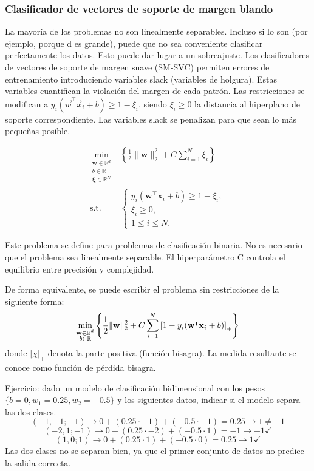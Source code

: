 \subsubsection{Clasificador de vectores de soporte de margen blando}

La mayoría de los problemas no son linealmente separables. Incluso si lo son (por ejemplo, porque d es grande), puede que no sea conveniente clasificar perfectamente los datos. Esto puede dar lugar a un sobreajuste. Los clasificadores de vectores de soporte de margen suave (SM-SVC) permiten errores de entrenamiento introduciendo variables slack (variables de holgura). Estas variables cuantifican la violación del margen de cada patrón. Las restricciones se modifican a $y_i(\vec{w}^\intercal \vec{x}_i + b) \geq 1 - \xi_i$, siendo $\xi_i \geq 0$ la distancia al hiperplano de soporte correspondiente. Las variables slack se penalizan para que sean lo más pequeñas posible.

\begin{align*}
\min_{\substack{\mathbf{w}\in\mathbb{R}^d \\ b\in\mathbb{R} \\ \boldsymbol{\xi}\in\mathbb{R}^N}} &
\left\{\frac{1}{2}\|\mathbf{w}\|_2^2 + C\sum_{i=1}^N \xi_i\right\} \\
\text{s.t.} &
\begin{cases}
y_i(\mathbf{w}^{\intercal}\mathbf{x}_i + b) \geq 1 - \xi_i, \\
\xi_i \geq 0, \\
1 \leq i \leq N.
\end{cases}
\end{align*}

Este problema se define para problemas de clasificación binaria. No es necesario que el problema sea linealmente separable. El hiperparámetro C controla el equilibrio entre precisión y complejidad.

De forma equivalente, se puede escribir el problema sin restricciones de la siguiente forma:
$$
\min_{\begin{subarray}{c}
    \mathbf{w} \in \mathbb{R}^d \\ 
    b \in \mathbb{R}
\end{subarray}} 
\left\{ 
    \frac{1}{2} \|\mathbf{w}\|_2^2 + C \sum_{i=1}^{N} \left[1 - y_i(\mathbf{w}^\intercal \mathbf{x}_i + b)\right]_+ 
\right\}$$
donde $|\chi|_+$ denota la parte positiva (función bisagra). La medida resultante se conoce como función de pérdida bisagra.

Ejercicio: dado un modelo de clasificación bidimensional con los pesos $\{b = 0, w_1 = 0.25, w_2 = -0.5\}$ y los siguientes datos, indicar si el modelo separa las dos clases.
$$(-1, -1; -1) \rightarrow 0 + (0.25 \cdot -1) + (-0.5 \cdot -1) = 0.25 \rightarrow 1 \neq -1$$
$$(-2, 1; -1) \rightarrow 0 + (0.25 \cdot -2) + (-0.5 \cdot 1) = -1 \rightarrow -1 \checkmark$$
$$(1, 0; 1) \rightarrow 0 + (0.25 \cdot 1) + (-0.5 \cdot 0) = 0.25 \rightarrow 1 \checkmark$$
Las dos clases no se separan bien, ya que el primer conjunto de datos no predice la salida correcta.

